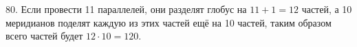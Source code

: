 80. Если провести 11 параллелей, они разделят глобус на $11+1=12$ частей, а 10 меридианов поделят каждую из этих частей ещё на 10 частей, таким образом всего частей будет $12\cdot10=120.$\\
